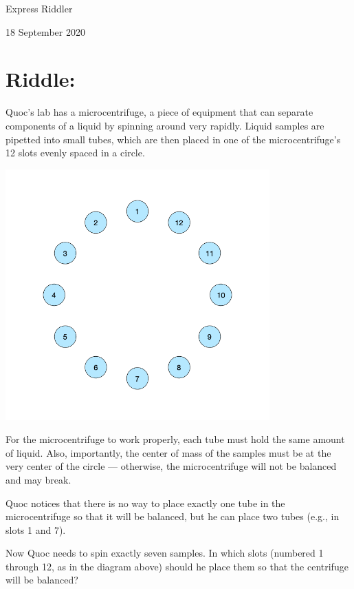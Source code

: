 \documentclass{article}
\begin{document}
\pagestyle{empty} %

\begin{center}
{\LARGE Express Riddler}

\vspace{0.15in}

{\Large 18 September 2020}
\end{center}


\section*{Riddle:}

Quoc's lab has a microcentrifuge, a piece of equipment that can separate components of a liquid by spinning around very rapidly.
Liquid samples are pipetted into small tubes, which are then placed in one of the microcentrifuge's 12 slots evenly spaced in a circle.

\begin{center}
\includegraphics[width=4in]{centrifuge-2.png}
\end{center}

For the microcentrifuge to work properly, each tube must hold the same amount of liquid.
Also, importantly, the center of mass of the samples must be at the very center of the circle — otherwise, the microcentrifuge will not be balanced and may break.

Quoc notices that there is no way to place exactly one tube in the microcentrifuge so that it will be balanced, but he can place two tubes (e.g., in slots 1 and 7).

Now Quoc needs to spin exactly seven samples.
In which slots (numbered 1 through 12, as in the diagram above) should he place them so that the centrifuge will be balanced?
\end{document}
